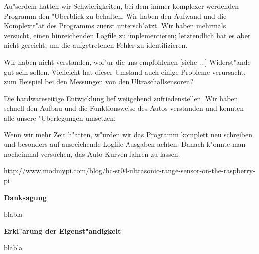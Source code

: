 \documentclass[a4paper,12pt]{article}
\begin{document}
Au"serdem hatten wir Schwierigkeiten, bei dem immer komplexer werdenden Programm den "Uberblick zu behalten.
Wir haben den Aufwand und die Komplexit"at des Programms zuerst untersch"atzt.
Wir haben mehrmals versucht, einen hinreichenden Logfile zu implementieren; letztendlich hat es aber nicht gereicht, um die aufgetretenen Fehler zu identifizieren.

Wir haben nicht verstanden, wof"ur die uns empfohlenen [siehe ...] Widerst"ande gut sein sollen.
Vielleicht hat dieser Umstand auch einige Probleme verursacht, zum Beispiel bei den Messungen von den Ultraschallsensoren?

Die hardwareseitige Entwicklung lief weitgehend zufriedenstellen.
Wir haben schnell den Aufbau und die Funktionsweise des Autos verstanden und konnten alle unsere "Uberlegungen umsetzen.

Wenn wir mehr Zeit h"atten, w"urden wir das Programm komplett neu schreiben und besonders auf ausreichende Logfile-Ausgaben achten.
Danach k"onnte man nocheinmal versuchen, das Auto Kurven fahren zu lassen.

\bigskip


\begin{thebibliography}{99}
	\itemsep-2pt \small
	 http://www.modmypi.com/blog/hc-sr04-ultrasonic-range-sensor-on-the-raspberry-pi
\end{thebibliography}

\newpage


{\large\bf Danksagung}

\medskip

blabla

\bigskip


{\large\bf Erkl"arung der Eigenst"andigkeit}

\medskip

blabla
\end{document}
